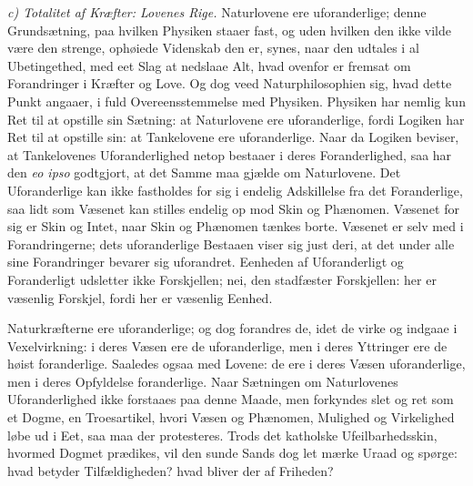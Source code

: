 \documentclass[12pt,a4paper]{book}
\newcommand{\runin}[1]{\emph{#1}\hspace{0.4em}}
\begin{document}
\runin{c) Totalitet af Kræfter: Lovenes Rige.} Naturlovene ere
uforanderlige; denne Grundsætning, paa hvilken Physiken staaer
fast, og uden hvilken den ikke vilde være den strenge, ophøiede
Videnskab den er, synes, naar den
udtales i al Ubetingethed, med eet Slag at nedslaae Alt, hvad
ovenfor er fremsat om Forandringer i Kræfter og Love. Og dog
veed Naturphilosophien sig, hvad dette Punkt angaaer, i fuld
Overeensstemmelse med Physiken. Physiken har nemlig kun Ret
til at opstille sin Sætning: at Naturlovene ere uforanderlige,
fordi Logiken har Ret til at opstille sin: at Tankelovene ere
uforanderlige. Naar da Logiken beviser, at Tankelovenes
Uforanderlighed netop bestaaer i deres Foranderlighed, saa har den
\textit{eo ipso} godtgjort, at det Samme maa gjælde om
Naturlovene. Det Uforanderlige kan ikke fastholdes for sig i endelig
Adskillelse fra det Foranderlige, saa lidt som Væsenet kan stilles
endelig op mod Skin og Phænomen. Væsenet for sig er Skin og
Intet, naar Skin og Phænomen tænkes borte. Væsenet er selv med
i Forandringerne; dets uforanderlige Bestaaen viser sig just deri,
at det under alle sine Forandringer bevarer sig uforandret.
Eenheden af Uforanderligt og Foranderligt udsletter ikke Forskjellen;
nei, den stadfæster Forskjellen: her er væsenlig Forskjel, fordi
her er væsenlig Eenhed.

Naturkræfterne ere uforanderlige; og dog forandres de, idet de
virke og indgaae i Vexelvirkning: i deres Væsen ere de
uforanderlige, men i deres Yttringer ere de høist foranderlige.
Saaledes ogsaa med Lovene: de ere i deres Væsen uforanderlige,
men i deres Opfyldelse foranderlige. Naar Sætningen om
Naturlovenes Uforanderlighed ikke forstaaes paa denne Maade, men
forkyndes slet og ret som et Dogme, en Troesartikel, hvori Væsen
og Phænomen, Mulighed og Virkelighed løbe ud i Eet, saa maa
der protesteres. Trods det katholske Ufeilbarhedsskin, hvormed
Dogmet prædikes, vil den sunde Sands dog let mærke Uraad og
spørge: hvad betyder Tilfældigheden? hvad bliver der af Friheden?
\end{document}

